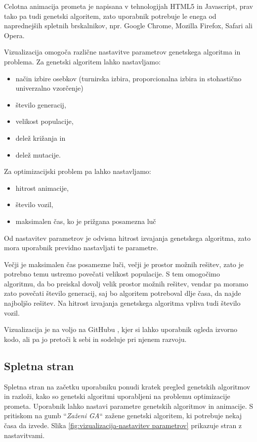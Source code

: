 \documentclass[a4paper, 12pt]{book}
\begin{document}
Celotna animacija prometa je napisana v tehnologijah HTML5 in Javascript, prav tako pa tudi genetski algoritem, zato uporabnik potrebuje le enega od naprednej\v sih spletnih brskalnikov, npr. Google Chrome, Mozilla Firefox, Safari ali Opera.

Vizualizacija omogo\v ca razli\v cne nastavitve parametrov genetskega algoritma in problema. Za genetski algoritem lahko nastavljamo:

\begin{itemize}
\item na\v cin izbire osebkov (turnirska izbira, proporcionalna izbira in stohasti\v cno univerzalno vzor\v cenje)
\item \v stevilo generacij,
\item velikost populacije,
\item dele\v z kri\v zanja in
\item dele\v z mutacije.
\end{itemize}

Za optimizacijski problem pa lahko nastavljamo:

\begin{itemize}
\item hitrost animacije,
\item \v stevilo vozil,
\item maksimalen \v cas, ko je pri\v zgana posamezna lu\v c
\end{itemize}

Od nastavitev parametrov je odvisna hitrost izvajanja genetskega algoritma, zato mora uporabnik previdno nastavljati te parametre.

Ve\v cji je maksimalen \v cas posamezne lu\v ci, ve\v cji je prostor mo\v znih re\v sitev, zato je potrebno temu ustrezno pove\v cati velikost populacije. S tem omogo\v cimo algoritmu, da bo preiskal dovolj velik prostor mo\v znih re\v sitev, vendar pa moramo zato pove\v cati \v stevilo generacij, saj bo algoritem potreboval dlje \v casa, da najde najbolj\v so re\v sitev. Na hitrost izvajanja genetskega algoritma vpliva tudi \v stevilo vozil.

Vizualizacija je na voljo na GitHubu \cite{izvorna koda}, kjer si lahko uporabnik ogleda izvorno kodo, ali pa jo preto\v ci k sebi in sodeluje pri njenem razvoju.

\subsection{Spletna stran}
Spletna stran na za\v cetku uporabniku ponudi kratek pregled genetskih algoritmov in razlo\v zi, kako so genetski algoritmi uporabljeni na problemu optimizacije prometa. Uporabnik lahko nastavi parametre genetskih algoritmov in animacije. S pritiskom na gumb ``\textit{Za\v zeni GA}`` za\v zene genetski algoritem, ki potrebuje nekaj \v casa da izvede. Slika \ref{fig:vizualizacija-nastavitev parametrov} prikazuje stran z nastavitvami. 
\end{document}

